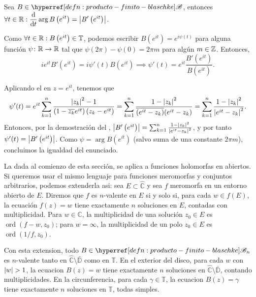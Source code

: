 \begin{cor}\label{cor:derivada-arg-prod-finito-blaschke-toro}
    Sea $B \in \exhyperref[defn:producto-finito-blaschke]{producto-finito-blaschke}{\mathscr{B}}$, entonces $\ds \forall t \in \R : \odv{}{t} \arg B\left(e^{it}\right) = \abs{B'\left(e^{it}\right)}$.
\end{cor}
\begin{dem}
    Como $\forall t \in \mathbb{R} : B\left(e^{it}\right) \in \mathbb{T}$, podemos escribir $B\left(e^{it}\right) = e^{i \psi(t)}$ para alguna función $\psi \colon \mathbb{R} \to \mathbb{R}$ tal que $\psi(2\pi) - \psi(0) = 2\pi m$ para algún $m \in \mathbb{Z}$. Entonces,
    \[
    i e^{it} B'\left(e^{it}\right) = i \psi'(t) B\left(e^{it}\right) \implies \psi'(t) = e^{it} \frac{B'\left(e^{it}\right)}{B\left(e^{it}\right)}.
    \]

    Aplicando el  en $z = e^{it}$, tenemos que
    \[
    \psi'(t) = e^{it} \sum_{k=1}^n \frac{\left|z_k\right|^2 - 1}{\left(1 - \overline{z_k} e^{it}\right) (z_k - e^{it})} = \sum_{k=1}^n \frac{1 - \left|z_k\right|^2}{\overline{\left(e^{it} - z_k\right)} (e^{it} - z_k)} = \sum_{k=1}^n \frac{1 - \left|z_k\right|^2}{\left|e^{it} - z_k\right|^2}.
    \]
    Entonces, por la demostración del , $\left|B'\left(e^{it}\right)\right| = \sum_{k=1}^n \frac{1 - \left|z_k\right|^2}{\left|e^{it} - z_k\right|^2}$,
    y por tanto $\psi'(t) = \left|B'\left(e^{it}\right)\right|$.
    Como $\psi = \arg B\left(e^{it}\right)$ (salvo suma de una constante $2\pi m$), concluimos la igualdad del enunciado.\hfill\qedsymbol
\end{dem}

\begin{obs}\label{obs:n-valencia-prod-finito-blaschke-toro-exterior}
    La  dada al comienzo de esta sección, se aplica a funciones holomorfas en abiertos. Si queremos usar el mismo lenguaje para funciones meromorfas y conjuntos arbitrarios, podemos extenderla asi: sea $E \subset \widehat{\mathbb{C}}$ y sea $f$ meromorfa en un entorno abierto de $E$. Diremos que $f$ es $n$-valente en $E$ si y solo si, para cada $w \in f(E)$, la ecuación $f(z)=w$ tiene exactamente $n$ soluciones en $E$, contadas con multiplicidad. Para $w \in \mathbb{C}$, la multiplicidad de una solución $z_0 \in E$ es $\operatorname{ord}(f-w,z_0)$; para $w=\infty$, la multiplicidad de un polo $z_0 \in E$ es $\operatorname{ord}(1/f,z_0)$.

    Con esta extension, todo $B \in \exhyperref[defn:producto-finito-blaschke]{producto-finito-blaschke}{\mathscr{B}_n}$ es $n$-valente tanto en $\widehat{\mathbb{C}} \setminus \bar{\mathbb{D}}$ como en $\mathbb{T}$. En el exterior del disco, para cada $w$ con $\abs{w}>1$, la ecuacion $B(z)=w$ tiene exactamente $n$ soluciones en $\widehat{\mathbb{C}} \setminus \bar{\mathbb{D}}$, contando multiplicidades. En la circunferencia, para cada $\gamma \in \mathbb{T}$, la ecuacion $B(z)=\gamma$ tiene exactamente $n$ soluciones en $\mathbb{T}$, todas simples.
\end{obs}

